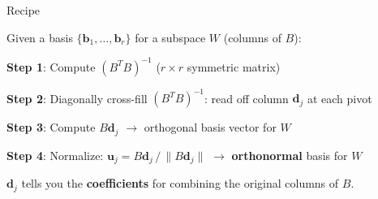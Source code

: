 \documentclass[10pt]{beamer}
\theoremstyle{definition}
\newcommand{\x}[1]{\alert{\textbf{#1}}}
\begin{document}
\begin{frame}{Recipe}

Given a basis $\{\mathbf{b}_1, \ldots, \mathbf{b}_r\}$ for a subspace $W$ (columns of $B$):

\vspace{0.5em}

\x{Step 1}: Compute $(B^TB)^{-1}$ \quad ($r \times r$ symmetric matrix)

\vspace{0.3em}

\x{Step 2}: Diagonally cross-fill $(B^TB)^{-1}$: read off column $\mathbf{d}_j$ at each pivot

\vspace{0.3em}

\x{Step 3}: Compute $B\mathbf{d}_j$ $\to$ orthogonal basis vector for $W$

\vspace{0.3em}

\x{Step 4}: Normalize: $\mathbf{u}_j = B\mathbf{d}_j \,/\, \|B\mathbf{d}_j\|$ $\to$ \x{orthonormal} basis for $W$

\vspace{0.5em}

$\mathbf{d}_j$ tells you the \x{coefficients} for combining the original columns of $B$.

\end{frame}
\end{document}
